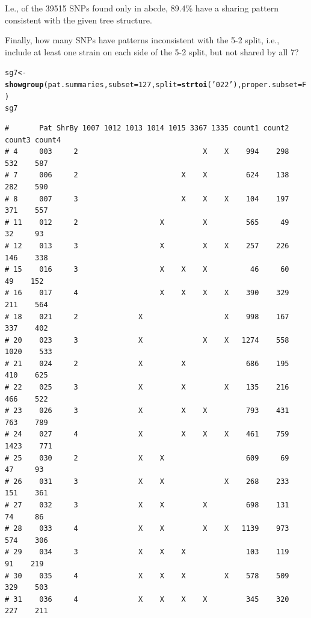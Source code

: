 \documentclass{article}\usepackage[]{graphicx}\usepackage[]{color}
\makeatletter
\newcommand{\hlnum}[1]{\textcolor[rgb]{0.686,0.059,0.569}{#1}}%
\newcommand{\hlstr}[1]{\textcolor[rgb]{0.192,0.494,0.8}{#1}}%
\newcommand{\hlstd}[1]{\textcolor[rgb]{0.345,0.345,0.345}{#1}}%
\newcommand{\hlkwb}[1]{\textcolor[rgb]{0.69,0.353,0.396}{#1}}%
\newcommand{\hlkwc}[1]{\textcolor[rgb]{0.333,0.667,0.333}{#1}}%
\newcommand{\hlkwd}[1]{\textcolor[rgb]{0.737,0.353,0.396}{\textbf{#1}}}%
\newenvironment{kframe}{%
 \def\at@end@of@kframe{}%
 \ifinner\ifhmode%
  \def\at@end@of@kframe{\end{minipage}}%
  \begin{minipage}{\columnwidth}%
 \fi\fi%
 \def\FrameCommand##1{\hskip\@totalleftmargin \hskip-\fboxsep
 \colorbox{shadecolor}{##1}\hskip-\fboxsep
     \hskip-\linewidth \hskip-\@totalleftmargin \hskip\columnwidth}%
 \MakeFramed {\advance\hsize-\width
   \@totalleftmargin\z@ \linewidth\hsize
   \@setminipage}}%
 {\par\unskip\endMakeFramed%
 \at@end@of@kframe}
\newenvironment{knitrout}{}{} %
\makeatother
\begin{document}
I.e., of the 39515 SNPs found only in abcde, 89.4\% have a sharing pattern consistent with the given tree structure.

Finally, how many SNPs have patterns inconsistent with the 5-2 split, i.e., include at least one strain on each side of the 5-2 split, but not shared by all 7?

\begin{knitrout}\footnotesize
{}\color{fgcolor}\begin{kframe}
\begin{alltt}
\hlstd{sg7} \hlkwb{<-} \hlkwd{showgroup}\hlstd{(pat.summaries,} \hlkwc{subset}\hlstd{=}\hlnum{127}\hlstd{,} \hlkwc{split}\hlstd{=}\hlkwd{strtoi}\hlstd{(}\hlstr{'022'}\hlstd{),} \hlkwc{proper.subset}\hlstd{=F)}
\hlstd{sg7}
\end{alltt}
\begin{verbatim}
#       Pat ShrBy 1007 1012 1013 1014 1015 3367 1335 count1 count2 count3 count4
# 4     003     2                             X    X    994    298    532    587
# 7     006     2                        X    X         624    138    282    590
# 8     007     3                        X    X    X    104    197    371    557
# 11    012     2                   X         X         565     49     32     93
# 12    013     3                   X         X    X    257    226    146    338
# 15    016     3                   X    X    X          46     60     49    152
# 16    017     4                   X    X    X    X    390    329    211    564
# 18    021     2              X                   X    998    167    337    402
# 20    023     3              X              X    X   1274    558   1020    533
# 21    024     2              X         X              686    195    410    625
# 22    025     3              X         X         X    135    216    466    522
# 23    026     3              X         X    X         793    431    763    789
# 24    027     4              X         X    X    X    461    759   1423    771
# 25    030     2              X    X                   609     69     47     93
# 26    031     3              X    X              X    268    233    151    361
# 27    032     3              X    X         X         698    131     74     86
# 28    033     4              X    X         X    X   1139    973    574    306
# 29    034     3              X    X    X              103    119     91    219
# 30    035     4              X    X    X         X    578    509    329    503
# 31    036     4              X    X    X    X         345    320    227    211

\end{verbatim}
\end{kframe}
\end{knitrout}
\end{document}
